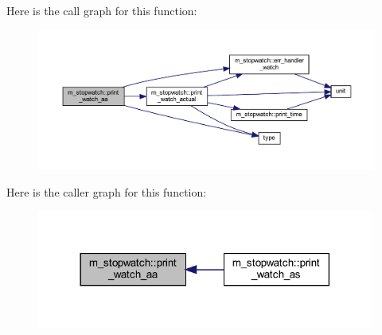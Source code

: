 Here is the call graph for this function\+:
\nopagebreak
\begin{figure}[H]
\begin{center}
\leavevmode
\includegraphics[width=350pt]{namespacem__stopwatch_a1069de62b768281802b7d9528929f216_cgraph}
\end{center}
\end{figure}
Here is the caller graph for this function\+:
\nopagebreak
\begin{figure}[H]
\begin{center}
\leavevmode
\includegraphics[width=314pt]{namespacem__stopwatch_a1069de62b768281802b7d9528929f216_icgraph}
\end{center}
\end{figure}
\mbox{\label{namespacem__stopwatch_a7c7423ee45c538535f59517d5a34abba}} 
